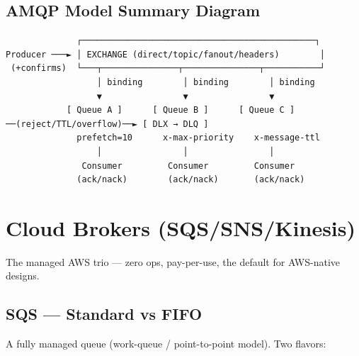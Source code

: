\documentclass[11pt]{article}
\begin{document}
\subsection{AMQP Model Summary Diagram}\label{amqp-model-summary-diagram}

\setcodelang{}

\begin{verbatim}
              ┌──────────────────────────────────────────────┐
Producer ───► │ EXCHANGE (direct/topic/fanout/headers)        │
 (+confirms)  └───┬───────────────┬───────────────┬───────────┘
                  │ binding        │ binding        │ binding
                  ▼                ▼                ▼
            [ Queue A ]      [ Queue B ]      [ Queue C ]  ──(reject/TTL/overflow)──► [ DLX → DLQ ]
              prefetch=10      x-max-priority    x-message-ttl
                  │                │                │
               Consumer         Consumer         Consumer
              (ack/nack)        (ack/nack)       (ack/nack)
\end{verbatim}

\section{Cloud Brokers (SQS/SNS/Kinesis)}\label{cloud-brokers-sqssnskinesis}

The managed AWS trio --- zero ops, pay-per-use, the default for AWS-native designs.

\subsection{SQS --- Standard vs FIFO}\label{sqs--standard-vs-fifo}

A fully managed queue (work-queue / point-to-point model). Two flavors:
\end{document}
